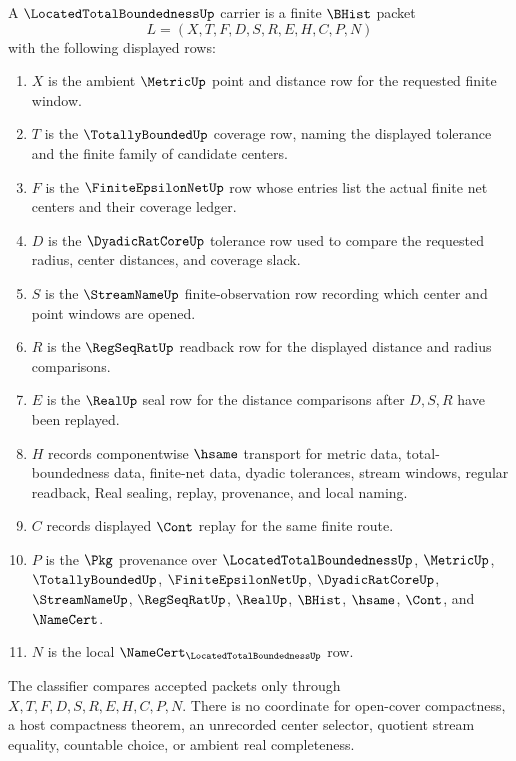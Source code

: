 \begin{definition}
\label{def:located-total-boundedness-carrier}
A $\LocatedTotalBoundednessUp$ carrier is a finite $\BHist$ packet
$$
L=(X,T,F,D,S,R,E,H,C,P,N)
$$
with the following displayed rows:
\begin{enumerate}
\item $X$ is the ambient $\MetricUp$ point and distance row for the requested finite window.
\item $T$ is the $\TotallyBoundedUp$ coverage row, naming the displayed tolerance and the finite family of candidate centers.
\item $F$ is the $\FiniteEpsilonNetUp$ row whose entries list the actual finite net centers and their coverage ledger.
\item $D$ is the $\DyadicRatCoreUp$ tolerance row used to compare the requested radius, center distances, and coverage slack.
\item $S$ is the $\StreamNameUp$ finite-observation row recording which center and point windows are opened.
\item $R$ is the $\RegSeqRatUp$ readback row for the displayed distance and radius comparisons.
\item $E$ is the $\RealUp$ seal row for the distance comparisons after $D,S,R$ have been replayed.
\item $H$ records componentwise $\hsame$ transport for metric data, total-boundedness data, finite-net data, dyadic tolerances, stream windows, regular readback, Real sealing, replay, provenance, and local naming.
\item $C$ records displayed $\Cont$ replay for the same finite route.
\item $P$ is the $\Pkg$ provenance over $\LocatedTotalBoundednessUp$, $\MetricUp$, $\TotallyBoundedUp$, $\FiniteEpsilonNetUp$, $\DyadicRatCoreUp$, $\StreamNameUp$, $\RegSeqRatUp$, $\RealUp$, $\BHist$, $\hsame$, $\Cont$, and $\NameCert$.
\item $N$ is the local $\NameCert_{\LocatedTotalBoundednessUp}$ row.
\end{enumerate}
The classifier compares accepted packets only through $X,T,F,D,S,R,E,H,C,P,N$. There is no coordinate for open-cover compactness, a host compactness theorem, an unrecorded center selector, quotient stream equality, countable choice, or ambient real completeness.
\end{definition}

